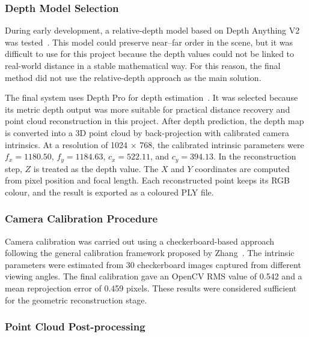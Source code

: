 \documentclass[12pt]{interim_report}
\begin{document}
\subsubsection{Depth Model Selection}
\label{subsubsec:depth-model-selection-junjie-ouyang}

During early development, a relative-depth model based on Depth Anything V2 was tested~\cite{yang2024}. This model could preserve near--far order in the scene, but it was difficult to use for this project because the depth values could not be linked to real-world distance in a stable mathematical way. For this reason, the final method did not use the relative-depth approach as the main solution.

The final system uses Depth Pro for depth estimation~\cite{bochkovskii2024}. It was selected because its metric depth output was more suitable for practical distance recovery and point cloud reconstruction in this project. After depth prediction, the depth map is converted into a 3D point cloud by back-projection with calibrated camera intrinsics. At a resolution of 1024 $\times$ 768, the calibrated intrinsic parameters were $f_x = 1180.50$, $f_y = 1184.63$, $c_x = 522.11$, and $c_y = 394.13$. In the reconstruction step, $Z$ is treated as the depth value. The $X$ and $Y$ coordinates are computed from pixel position and focal length. Each reconstructed point keeps its RGB colour, and the result is exported as a coloured PLY file.

\subsubsection{Camera Calibration Procedure}
\label{subsubsec:camera-calibration-procedure-junjie-ouyang}

Camera calibration was carried out using a checkerboard-based approach following the general calibration framework proposed by Zhang~\cite{zhang2000}. The intrinsic parameters were estimated from 30 checkerboard images captured from different viewing angles. The final calibration gave an OpenCV RMS value of 0.542 and a mean reprojection error of 0.459 pixels. These results were considered sufficient for the geometric reconstruction stage.

\subsubsection{Point Cloud Post-processing}
\label{subsubsec:point-cloud-postprocessing-junjie-ouyang}
\end{document}
